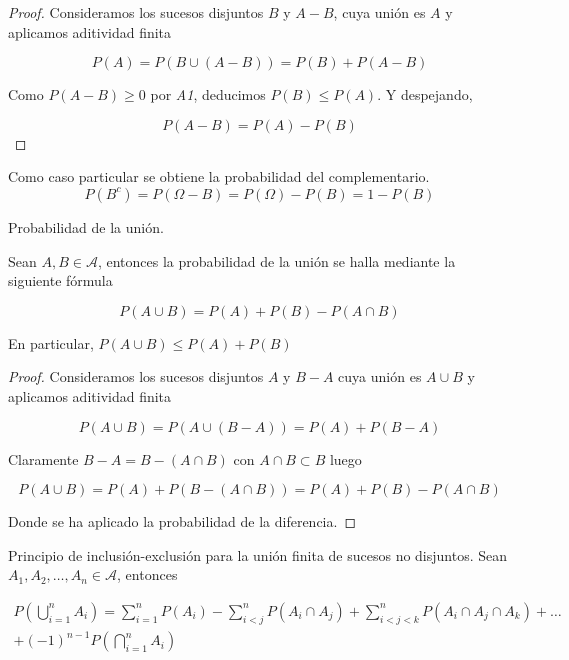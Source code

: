 \documentclass[
  a4paper,
  spanish,
  12pt,
]{scrartcl}
\begin{document}
\begin{proof}
Consideramos los sucesos disjuntos $B$ y $A-B$, cuya unión es $A$ y aplicamos aditividad finita

$$
P(A) = P(B \cup (A-B)) = P(B) + P(A-B)
$$

Como $P(A-B) \geq 0$ por \emph{A1}, deducimos $P(B) \leq P(A)$. 
Y despejando,

$$
P(A-B) = P(A) - P(B)
$$

\end{proof}

\begin{nota}
    Como caso particular se obtiene la probabilidad del complementario.
$$
P(B^c) = P(\Omega - B) = P(\Omega) - P(B) = 1 - P(B)
$$
\end{nota}

\begin{nprop}
Probabilidad de la unión.

Sean $A, B \in \mathcal{A}$, entonces la probabilidad de la unión se halla mediante la siguiente fórmula

$$
P(A \cup B) = P(A) + P(B) - P(A \cap B)
$$

En particular, $P(A\cup B) \leq P(A) + P(B)$
\end{nprop}

\begin{proof}

Consideramos los sucesos disjuntos $A$ y $B-A$ cuya unión es $A \cup B$ y aplicamos aditividad finita

$$
P(A \cup B) = P(A \cup (B-A)) = P(A) + P(B-A)
$$

Claramente $B-A = B - (A \cap B)$ con $A \cap B \subset B$ luego

$$
P(A \cup B) = P(A)  + P(B - (A \cap B)) = P(A) + P(B) - P(A \cap B)
$$

Donde se ha aplicado la probabilidad de la diferencia. 

\end{proof}

\begin{nprop}
Principio de inclusión-exclusión para la unión finita de sucesos no disjuntos. Sean $A_1, A_2, \dots, A_n \in \mathcal{A}$, entonces

\begin{equation*}
\begin{aligned}
P\left(\bigcup_{i=1}^n A_i \right) = \sum_{i=1}^n P(A_i) - \sum_{i < j}^n P(A_i \cap A_j) + \sum_{i < j < k}^n P(A_i \cap A_j \cap A_k) + \dots \\
+ (-1)^{n-1} P\left(\bigcap_{i=1}^n A_i \right)
\end{aligned}
\end{equation*}

\end{nprop}
\end{document}
